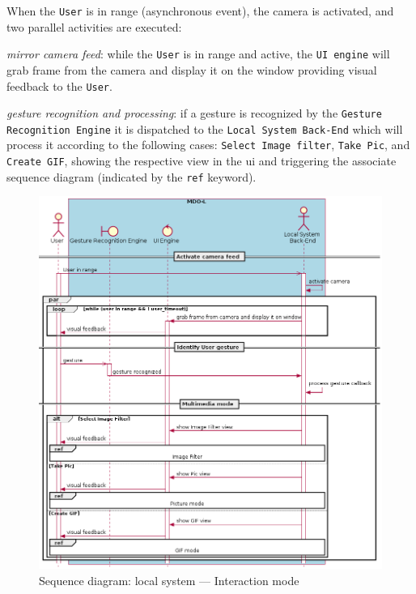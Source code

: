When the \texttt{User} is in range (asynchronous event), the camera is
activated, and two parallel activities are executed:
\begin{item-c}
\item \emph{mirror camera feed}: while the \texttt{User} is in range and
active, the \texttt{UI engine} will grab frame from the camera and display it on
the window providing visual feedback to the \texttt{User}.
\item \emph{gesture recognition and processing}: if a gesture is recognized by
  the \texttt{Gesture Recognition Engine} it is dispatched to the \texttt{Local
    System Back-End} which will process it according to the following cases:
  \texttt{Select Image filter}, \texttt{Take Pic}, and \texttt{Create GIF},
  showing the respective view in the \gls{ui} and triggering the associate
  sequence diagram (indicated by the \texttt{ref} keyword).
\end{item-c}
%
\begin{figure}[htb!]
  \centering
  \includegraphics[width=0.8\columnwidth]{./img/seq-local-interaction-mode.png}
  \caption{Sequence diagram: local system --- Interaction mode}%
\label{fig:seq-local-interaction-mode}
\end{figure}
%

